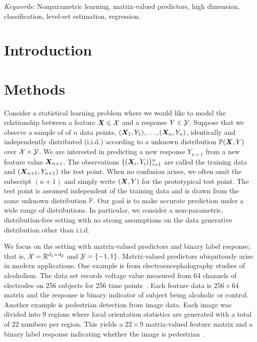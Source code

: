 \documentclass[12pt]{article}
\begin{document}
\noindent%
{\it Keywords:} Nonparametric learning, matrix-valued predictors, high dimension, classification, level-set estimation, regression.
\vfill


\newpage
{} %
\section{Introduction}
\label{sec:intro}

\section{Methods}
\label{sec:meth}
\setcounter{subsection}{-1}

Consider a statistical learning problem where we would like to model the relationship between a feature $\bm X \in \mathcal{X}$ and a response $Y\in\mathcal{Y}$. Suppose that we observe a sample of of $n$ data points, $(\bm X_1,Y_1),\ldots,(\bm X_n,Y_n)$, identically and independently distributed (i.i.d.) according to a unknown distribution $\mathbb{P}(\bm X,Y)$ over $\mathcal{X}\times \mathcal{Y}$. We are interested in predicting a new response $Y_{n+1}$ from a new feature value $\bm X_{n+1}$. The observations $\{(\bm X_i,Y_i)\}_{i=1}^n$ are called the training data and $(\bm X_{n+1},Y_{n+1})$ the test point. When no confusion arises, we often omit the subscript $(n+1)$ and simply write $(\bm X,Y)$ for the prototypical test point. The test point is assumed independent of the training data and is drawn from the same unknown distribution $\mathbb{P}$. Our goal is to make accurate prediction under a wide range of distributions. In particular, we consider a non-parametric, distribution-free setting with no strong assumptions on the data generative distribution other than i.i.d. 


We focus on the setting with matrix-valued predictors and binary label response; that is, $\mathcal{X}=\mathbb{R}^{d_1\times d_2}$ and $\mathcal{Y}=\{-1,1\}$. Matrix-valued predictors ubiquitously arise in modern applications. One example is from electroencephalography studies of alcoholism. The data set records voltage value measured from 64 channels of electrodes on 256 subjects for 256 time points~\citep{zhou2014regularized}. Each feature data is $256\times 64$ matrix and the response is binary indicator of subject being alcoholic or control. Another example is pedestrian detection from image data. Each image was divided into 9 regions where local orientation statistics are generated with a total of 22 numbers per region. This yields a $22 \times 9$ matrix-valued feature matrix and a binary label response indicating whether the image is pedestrian~\citep{Shashua2004PedestrianDF}. 
\end{document}
